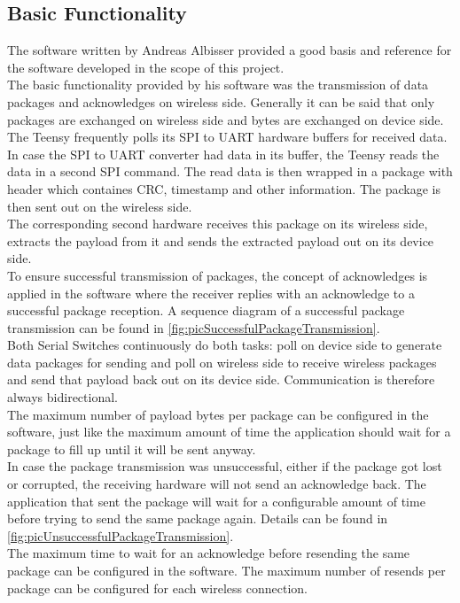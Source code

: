 \subsection{Basic Functionality}
The software written by Andreas Albisser provided a good basis and reference for the software developed in the scope of this project.\\
The basic functionality provided by his software was the transmission of data packages and acknowledges on wireless side. Generally it can be said that only packages are exchanged on wireless side and bytes are exchanged on device side. \\
The Teensy frequently polls its SPI to UART hardware buffers for received data. In case the SPI to UART converter had data in its buffer, the Teensy reads the data in a second SPI command. The read data is then wrapped in a package with header which containes CRC, timestamp and other information. The package is then sent out on the wireless side.\\
The corresponding second hardware receives this package on its wireless side, extracts the payload from it and sends the extracted payload out on its device side. \\
To ensure successful transmission of packages, the concept of acknowledges is applied in the software where the receiver replies with an acknowledge to a successful package reception. A sequence diagram of a successful package transmission can be found in \autoref{fig:picSuccessfulPackageTransmission}.\\
Both Serial Switches continuously do both tasks: poll on device side to generate data packages for sending and poll on wireless side to receive wireless packages and send that payload back out on its device side. Communication is therefore always bidirectional.\\ 
%
The maximum number of payload bytes per package can be configured in the software, just like the maximum amount of time the application should wait for a package to fill up until it will be sent anyway.\\
In case the package transmission was unsuccessful, either if the package got lost or corrupted, the receiving hardware will not send an acknowledge back. The application that sent the package will wait for a configurable amount of time before trying to send the same package again. Details can be found in \autoref{fig:picUnsuccessfulPackageTransmission}.\\
The maximum time to wait for an acknowledge before resending the same package can be configured in the software. The maximum number of resends per package can be configured for each wireless connection. \\
%
%
